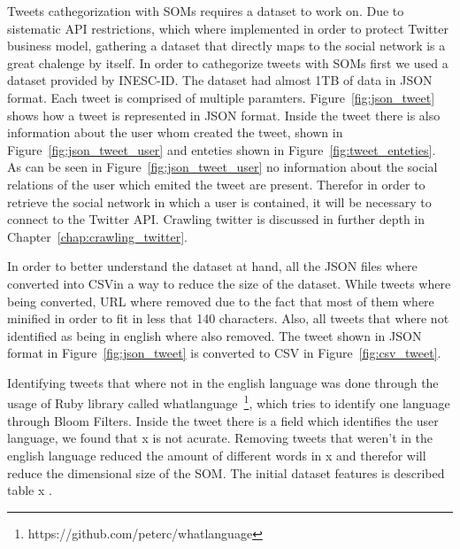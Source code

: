 
Tweets cathegorization with \ac{SOMs} requires a dataset to work on. Due to sistematic API restrictions, which where implemented in order to protect Twitter business model, gathering a dataset that directly maps to the social network is a great chalenge by itself. 
In order to cathegorize tweets with \ac{SOMs} first we used a dataset provided by INESC-ID. The dataset had almost 1TB of data in \ac{JSON} format.
Each tweet is comprised of multiple paramters. Figure~\ref{fig:json_tweet} shows how a tweet is represented in \ac{JSON} format. Inside the tweet there is also information about the user whom created the tweet, shown in Figure~\ref{fig:json_tweet_user} and enteties shown in Figure~\ref{fig:tweet_enteties}.
As can be seen in Figure~\ref{fig:json_tweet_user} no information about the social relations of the user which emited the tweet are present. Therefor in order to retrieve the social network in which a user is contained, it will be necessary to connect to the Twitter API. Crawling twitter is discussed in further depth in Chapter~\ref{chap:crawling_twitter}.  





In order to better understand the dataset at hand, all the \ac{JSON} files where converted into \ac{CSV}in a way to reduce the size of the dataset. While tweets where being converted, \ac{URL} where removed due to the fact that most of them where minified in order to fit in less that 140 characters. Also, all tweets that where not identified as being in english where also removed. The tweet shown in \ac{JSON} format in Figure~\ref{fig:json_tweet} is converted to \ac{CSV} in Figure~\ref{fig:csv_tweet}.

Identifying tweets that where not in the english language was done through the usage of Ruby library called whatlanguage~\footnote{https://github.com/peterc/whatlanguage}, which tries to identify one language through Bloom Filters. Inside the tweet there is a field which identifies the user language, we found that x is not acurate. Removing tweets that weren't in the english language reduced the amount of different words in x and therefor will reduce the dimensional size of the \ac{SOM}.
The initial dataset features is described table x
 .


